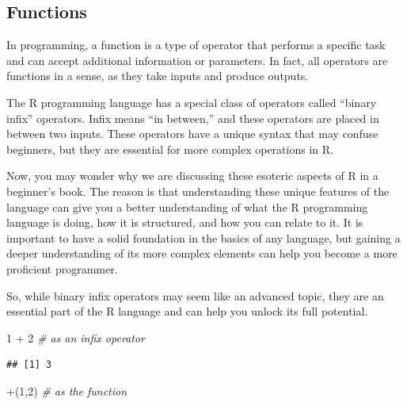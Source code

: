 \documentclass[
]{book}
\newenvironment{Shaded}{\begin{snugshade}}{\end{snugshade}}
\newcommand{\AttributeTok}[1]{\textcolor[rgb]{0.77,0.63,0.00}{#1}}
\newcommand{\CommentTok}[1]{\textcolor[rgb]{0.56,0.35,0.01}{\textit{#1}}}
\newcommand{\DecValTok}[1]{\textcolor[rgb]{0.00,0.00,0.81}{#1}}
\newcommand{\NormalTok}[1]{#1}
\newcommand{\SpecialCharTok}[1]{\textcolor[rgb]{0.00,0.00,0.00}{#1}}
\newcommand{\StringTok}[1]{\textcolor[rgb]{0.31,0.60,0.02}{#1}}
\begin{document}
\hfill\break

\hypertarget{functions}{%
\subsection{Functions}\label{functions}}

In programming, a function is a type of operator that performs a specific task and can accept additional information or parameters. In fact, all operators are functions in a sense, as they take inputs and produce outputs.

The R programming language has a special class of operators called ``binary infix'' operators. Infix means ``in between,'' and these operators are placed in between two inputs. These operators have a unique syntax that may confuse beginners, but they are essential for more complex operations in R.

Now, you may wonder why we are discussing these esoteric aspects of R in a beginner's book. The reason is that understanding these unique features of the language can give you a better understanding of what the R programming language is doing, how it is structured, and how you can relate to it. It is important to have a solid foundation in the basics of any language, but gaining a deeper understanding of its more complex elements can help you become a more proficient programmer.

So, while binary infix operators may seem like an advanced topic, they are an essential part of the R language and can help you unlock its full potential.

\begin{Shaded}
\begin{Highlighting}[]
\DecValTok{1} \SpecialCharTok{+} \DecValTok{2}          \CommentTok{\# as an infix operator }
\end{Highlighting}
\end{Shaded}

\begin{verbatim}
## [1] 3
\end{verbatim}

\begin{Shaded}
\begin{Highlighting}[]
\StringTok{\textasciigrave{}}\AttributeTok{+}\StringTok{\textasciigrave{}}\NormalTok{(}\DecValTok{1}\NormalTok{,}\DecValTok{2}\NormalTok{)       }\CommentTok{\# as the function}
\end{Highlighting}
\end{Shaded}
\end{document}
